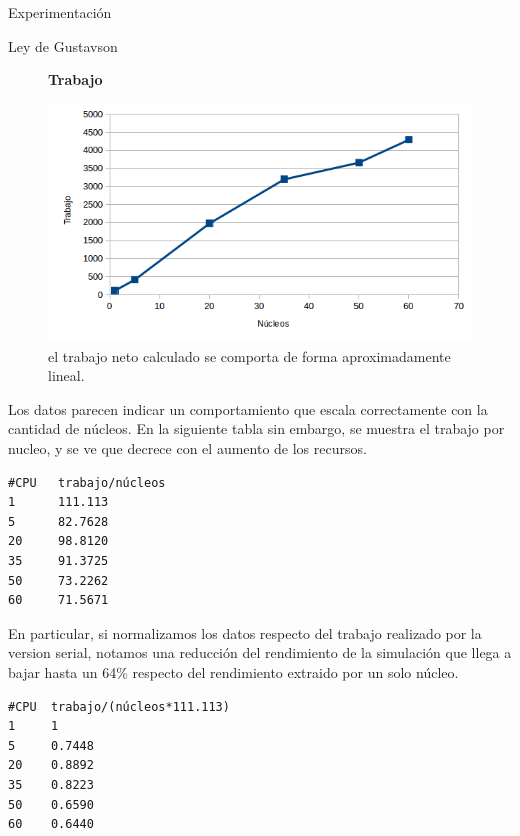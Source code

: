 \begin{section}{Experimentación}
\begin{subsection}{Ley de Gustavson}
\begin{figure}
\textbf{Trabajo}

\includegraphics[width=\textwidth/2,height=\textheight/2,keepaspectratio]{figures/exp_gustafson_work}
\caption{el trabajo neto calculado se comporta de forma aproximadamente lineal.}
\label{fig:exp_gustafson_work}
\end{figure}
\begin{minipage}{\linewidth}
Los datos parecen indicar un comportamiento que escala correctamente con la cantidad de núcleos. En la siguiente tabla sin embargo, se muestra el trabajo por nucleo, y se ve que decrece con el aumento de los recursos.

\begin{tcolorbox}[colback=blue!5!white,colframe=blue!75!black,title=Trabajo por núcleo]
\begin{verbatim}
#CPU   trabajo/núcleos
1      111.113
5      82.7628
20     98.8120
35     91.3725
50     73.2262
60     71.5671
\end{verbatim}
\end{tcolorbox}
\end{minipage}

\begin{minipage}{\linewidth}

En particular, si normalizamos los datos respecto del trabajo realizado por la version serial, notamos una reducción del rendimiento de la simulación que llega a bajar hasta un 64\% respecto del rendimiento extraido por un solo núcleo.
\begin{tcolorbox}[colback=blue!5!white,colframe=blue!75!black,title=Trabajo normalizado]
\begin{verbatim}
#CPU  trabajo/(núcleos*111.113)
1     1
5     0.7448
20    0.8892
35    0.8223
50    0.6590
60    0.6440
\end{verbatim}
\end{tcolorbox}
\end{minipage}


\end{subsection}
\end{section}
